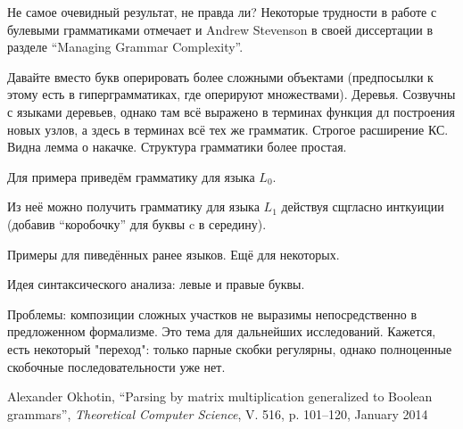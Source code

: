 \documentclass[12pt]{article}  %
\theoremstyle{definition}
\theoremstyle{remark}
\begin{document}
Не самое очевидный результат, не правда ли?
Некоторые трудности в работе с булевыми грамматиками отмечает и Andrew Stevenson в своей диссертации в разделе “Managing Grammar Complexity”. 



Давайте вместо букв оперировать более сложными объектами (предпосылки к этому есть в гиперграмматиках, где оперируют множествами). Деревья. 
Созвучны с языками деревьев, однако там всё выражено в терминах функция дл построения новых узлов, 
а здесь в терминах всё тех же грамматик.
Строгое расширение КС. Видна лемма о накачке. 
Структура грамматики более простая. 

Для примера приведём грамматику для языка $L_0$. 

Из неё можно получить грамматику для языка $L_1$ действуя сщгласно инткуиции (добавив ``коробочку'' для буквы c в середину).

Примеры для пиведённых ранее языков. Ещё для некоторых.

Идея синтаксического анализа: левые и правые буквы.

Проблемы: композиции сложных участков не выразимы непосредственно в предложенном формализме. Это 
тема для дальнейших исследований. Кажется, есть некоторый "переход": только парные скобки 
регулярны, однако полноценные скобочные последовательности уже нет.

\begin{thebibliography}{9}

  Alexander Okhotin,
  ``Parsing by matrix multiplication generalized to Boolean grammars'',
  \emph{Theoretical Computer Science},
  V. 516,
  p. 101--120,
  January 2014

\end{thebibliography}
\end{document}
